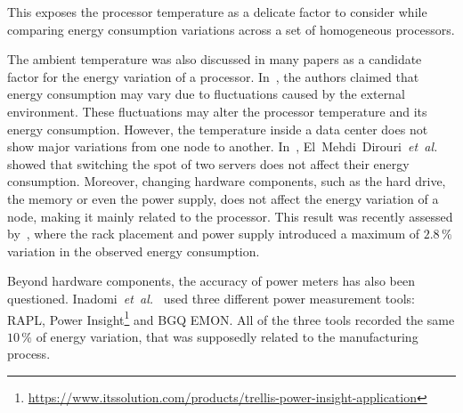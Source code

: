 
This exposes the processor temperature as a delicate factor to consider while comparing energy consumption variations across a set of homogeneous processors.%

The ambient temperature was also discussed in many papers as a candidate factor for the energy variation of a processor.
In~\cite{ranka_energy_2009}, the authors claimed that energy consumption may vary due to fluctuations caused by the external environment.
These fluctuations may alter the processor temperature and its energy consumption.
However, the temperature inside a data center does not show major variations from one node to another.
In~\cite{el_mehdi_diouri_your_2013}, El~Mehdi~Dirouri~\emph{et~al.} showed that switching the spot of two servers does not affect their energy consumption.
Moreover, changing hardware components, such as the hard drive, the memory or even the power supply, does not affect the energy variation of a node, making it mainly related to the processor.
This result was recently assessed by~\cite{wang_potential_2018}, where the rack placement and power supply introduced a maximum of $2.8\,\%$ variation in the observed energy consumption.

Beyond hardware components, the accuracy of power meters has also been questioned.
Inadomi~\emph{et~al.}~\cite{inadomi_analyzing_2015} used three different power measurement tools: RAPL, Power Insight\footnote{\url{https://www.itssolution.com/products/trellis-power-insight-application}} and BGQ EMON.
All of the three tools recorded the same $10\,\%$ of energy variation, that was supposedly related to the manufacturing process.

